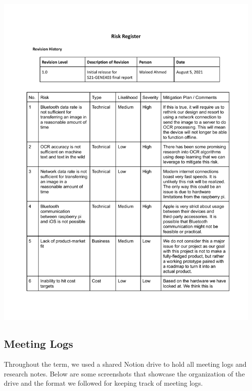 \documentclass[a4paper,11pt]{article}
\begin{document}
\includegraphics[page=2,width={1.0\linewidth}]{pdf/risk-register-1.0.pdf}

\newpage
\subsection{Meeting Logs}
\label{meeting-logs}
Throughout the term, we used a shared Notion drive to hold all meeting logs and research notes.
Below are some screenshots that showcase the organization of the drive and the format we followed for keeping track of meeting logs.
\end{document}

